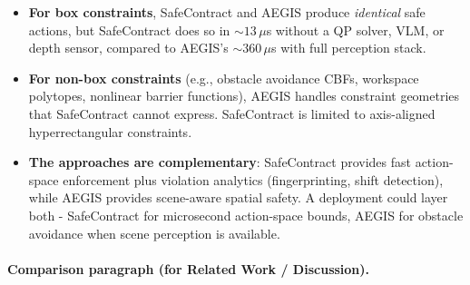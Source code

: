 \begin{itemize}
  \item \textbf{For box constraints}, SafeContract and AEGIS produce \emph{identical}
        safe actions, but SafeContract does so in ${\sim}13\,\mu$s without a QP solver,
        VLM, or depth sensor, compared to AEGIS's ${\sim}360\,\mu$s with full
        perception stack.
  \item \textbf{For non-box constraints} (e.g., obstacle avoidance CBFs, workspace
        polytopes, nonlinear barrier functions), AEGIS handles constraint geometries
        that SafeContract cannot express. SafeContract is limited to axis-aligned
        hyperrectangular constraints.
  \item \textbf{The approaches are complementary}: SafeContract provides fast
        action-space enforcement plus violation analytics (fingerprinting, shift
        detection), while AEGIS provides scene-aware spatial safety. A deployment
        could layer both - SafeContract for microsecond action-space bounds, AEGIS
        for obstacle avoidance when scene perception is available.
\end{itemize}

\paragraph{Comparison paragraph (for Related Work / Discussion).}
%
